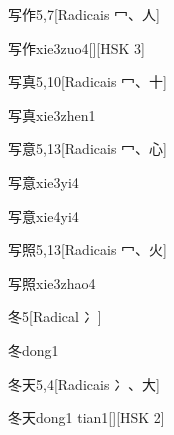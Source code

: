 \begin{entry}{写作}{5,7}[Radicais ⼍、⼈]
  \begin{phonetics}{写作}{xie3zuo4}[][HSK 3]
  \end{phonetics}
\end{entry}

\begin{entry}{写真}{5,10}[Radicais ⼍、⼗]
  \begin{phonetics}{写真}{xie3zhen1}
  \end{phonetics}
\end{entry}

\begin{entry}{写意}{5,13}[Radicais ⼍、⼼]
  \begin{phonetics}{写意}{xie3yi4}
  \end{phonetics}
  \begin{phonetics}{写意}{xie4yi4}
  \end{phonetics}
\end{entry}

\begin{entry}{写照}{5,13}[Radicais ⼍、⽕]
  \begin{phonetics}{写照}{xie3zhao4}
  \end{phonetics}
\end{entry}

\begin{entry}{冬}{5}[Radical ⼎]
  \begin{phonetics}{冬}{dong1}
  \end{phonetics}
\end{entry}

\begin{entry}{冬天}{5,4}[Radicais ⼎、⼤]
  \begin{phonetics}{冬天}{dong1 tian1}[][HSK 2]
  \end{phonetics}
\end{entry}

